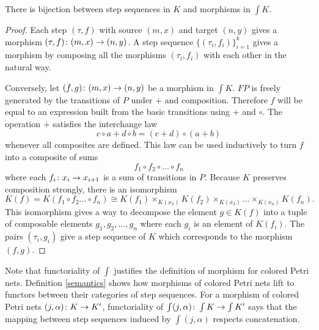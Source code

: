 \begin{prop}\label{soundness}
     There is bijection between step sequences in $K$ and morphisms in $\int K$. 
\end{prop}
\begin{proof}

Each step $(\tau ,f)$ with source $(m,x)$ and target $(n,y)$ gives a morphism 
$(\tau, f) \colon (m,x) \to (n,y)$. A step sequence $\{(\tau_i,f_i)\}_{i=1}^{k}$ gives a morphism by composing all the morphisms $(\tau_i,f_i)$ with each other in the natural way.

Conversely, let $(f,g) \colon (m,x) \to (n,y)$ be a morphism in $\int K$. $FP$ is freely generated by the transitions of $P$ under $+$ and composition. Therefore $f$ will be equal to an expression built from the basic transitions using $+$ and $\circ$.
The operation $+$ satisfies the interchange law
\[ c \circ a  + d \circ b =(c+ d) \circ (a +b) \]
whenever all composites are defined. This law can be used inductively to turn $f$ into a composite of sums
\[f_1 \circ f_2 \circ \ldots \circ f_n \]
where each $f_i \colon x_i \to x_{i+1}$ is a sum of transitions in $P$.
Because $K$ preserves composition strongly, there is an isomorphism
\[K(f) =K (f_1 \circ f_2 \ldots \circ f_n ) \cong K (f_1) \times_{K(x_2)} K(f_2) \times_{K(x_3)} \ldots \times_{K(x_{n}) } K(f_n).  \]
This isomorphism gives a way to decompose the element $g \in K(f)$ into a tuple of composable elements $g_1,g_2,\ldots, g_n$ where each $g_i$ is an element of $K(f_i)$. The pairs $(\tau_i,g_i)$ give a step sequence of $K$ which corresponds to the morphism $(f,g)$.
\end{proof}
Note that functoriality of $\int$ justifies the definition of morphism for colored Petri nets. Definition \ref{semantics} shows how morphisms of colored Petri nets lift to functors between their categories of step sequences. For a morphism of colored Petri nets $(j,\alpha) \colon K \to K'$, functoriality of $\int (j, \alpha) \colon \int K \to \int K'$ says that the mapping between step sequences induced by $\int (j,\alpha)$ respects concatenation.

